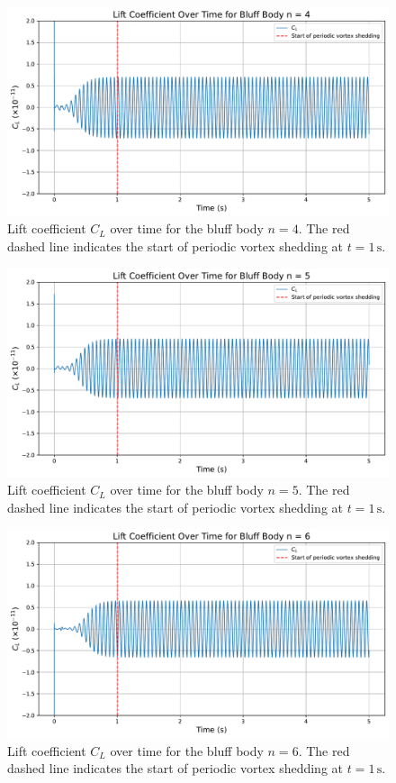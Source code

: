 \begin{figure}[H]
	\centering
	\includegraphics[width=\textwidth]{images/4face_graph}
	\caption{Lift coefficient $C_L$ over time for the bluff body $n=4$. The red dashed line indicates the start of periodic vortex shedding at $t = 1\,\mathrm{s}$.}
	\label{fig:4FaceGraph} 
\end{figure}

\begin{figure}[H]
	\centering
	\includegraphics[width=\textwidth]{images/5face_graph}
	\caption{Lift coefficient $C_L$ over time for the bluff body $n=5$. The red dashed line indicates the start of periodic vortex shedding at $t = 1\,\mathrm{s}$.}
	\label{fig:5FaceGraph} 
\end{figure}

\begin{figure}[H]
	\centering
	\includegraphics[width=\textwidth]{images/6face_graph}
	\caption{Lift coefficient $C_L$ over time for the bluff body $n=6$. The red dashed line indicates the start of periodic vortex shedding at $t = 1\,\mathrm{s}$.}
	\label{fig:6FaceGraph} 
\end{figure}

